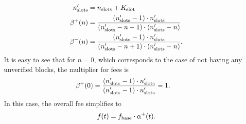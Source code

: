 \documentclass[9pt,oneside]{amsart}
\begin{document}
\begin{multicols}{2}

\begin{align}
n'_\textnormal{slots} &= n_\textnormal{slots} + K_\textnormal{slot} \\
\beta^+(n) &= \frac{(n'_\textnormal{slots}- 1) \cdot n'_\textnormal{slots}}{(n'_\textnormal{slots}-n-1)\cdot (n'_\textnormal{slots}-n)}\\
\beta^-(n) &= \frac{(n'_\textnormal{slots}- 1 ) \cdot n'_\textnormal{slots}}{(n'_\textnormal{slots}-n + 1)\cdot (n'_\textnormal{slots}-n)}.
\end{align}
It is easy to see that for $n=0$, which corresponds to the case of not having any unverified blocks, the multiplier for fees is
\begin{align}
\beta^+(0) &= \frac{(n'_\textnormal{slots}- 1 ) \cdot n'_\textnormal{slots}
}{(n'_\textnormal{slots}-1)\cdot n'_\textnormal{slots}}=1.
\end{align}
In this case, the overall fee simplifies to
\begin{align}
f(t) = f_\textnormal{base} \cdot \alpha^+(t).
\end{align}


\end{multicols}
\end{document}

